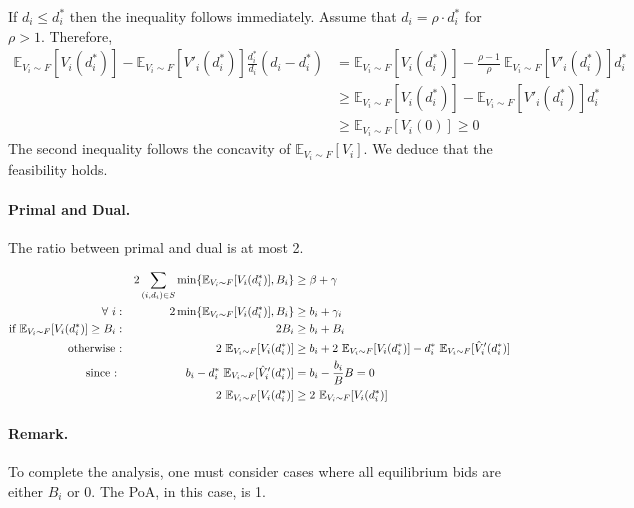 If $d_{i} \leq d^{*}_{i}$ then the inequality follows immediately. Assume that $d_{i} = \rho \cdot d^{*}_{i}$ for $\rho > 1$.
Therefore,
\begin{align*}
	\mathbb{E}_{V_i \sim F}[V_{i}(d^{*}_{i})]  - \mathbb{E}_{V_i \sim F}[V'_{i}(d^{*}_{i})] \frac{d^{*}_{i}}{d_{i}} (d_{i} - d^{*}_{i})
&= \mathbb{E}_{V_i \sim F}[V_{i}(d^{*}_{i})]  - \frac{\rho - 1}{\rho}\  \mathbb{E}_{V_i \sim F}[V'_{i}(d^{*}_{i})] d^{*}_{i} \\
%
&\geq \mathbb{E}_{V_i \sim F}[V_{i}(d^{*}_{i})]  - \mathbb{E}_{V_i \sim F}[V'_{i}(d^{*}_{i})] d^{*}_{i} \\
%
&\geq \mathbb{E}_{V_i \sim F}[V_{i}(0)] \geq 0
\end{align*}
The second inequality follows the concavity of $\mathbb{E}_{V_i \sim F}[V_{i}]$. We deduce that the feasibility holds.

\paragraph{Primal and Dual.}
The ratio between primal and dual is at most 2.

\begin{align*}
	&& 2\sum_{(i,d_{i}) \in S} \min\{\mathbb{E}_{V_i \sim F}[V_i(d_i^*)], B_i \} &\ge \beta + \gamma\\
	\forall\ i : && 2 \min\{\mathbb{E}_{V_i \sim F}[V_i(d_i^*)], B_i \} &\ge b_i + \gamma_i \\
	\textnormal{if } \mathbb{E}_{V_i \sim F}[V_i(d_i^*)] \ge B_i : && 2B_i &\ge b_i + B_i\\
	\textnormal{otherwise :} && 2 \ \mathbb{E}_{V_i \sim F}[V_i(d_i^*)] &\ge b_i + 2\ \mathbb{E}_{V_i \sim F}[V_{i}(d^{*}_{i})] - d^{*}_{i}\  \mathbb{E}_{V_i \sim F}[\hat{V}'_{i}(d^{*}_{i})]\\
	\textnormal{since : } && b_i - d^{*}_{i} \ \mathbb{E}_{V_i \sim F}[\hat{V}'_{i}(d^{*}_{i})] &= b_i - \frac{b_i}{B} B = 0\\
	&& 2\  \mathbb{E}_{V_i \sim F}[V_{i}(d^{*}_{i})] &\ge 2\  \mathbb{E}_{V_i \sim F}[V_{i}(d^{*}_{i})]
\end{align*}

\paragraph{Remark.} To complete the analysis, one must consider cases where all equilibrium bids are either $B_{i}$ or 0. The PoA, in this case, is 1.
